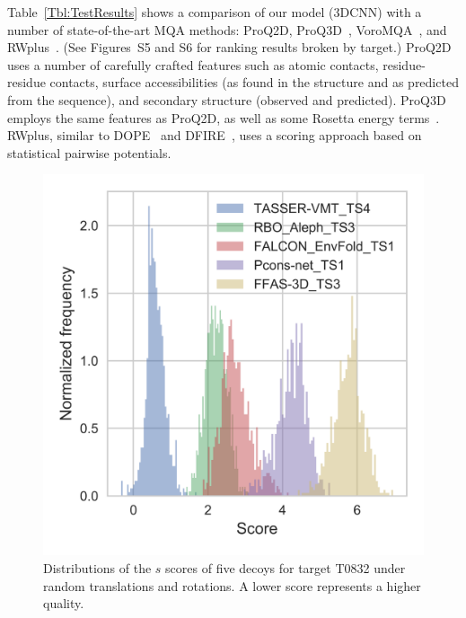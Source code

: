 \documentclass{bioinfo}
\begin{document}
Table~\ref{Tbl:TestResults} shows a comparison of our model (3DCNN)
with a number of state-of-the-art MQA methods: ProQ2D,
ProQ3D~\citep{uziela2017proq3d},
VoroMQA~\citep{olechnovivc2017voromqa}, and
RWplus~\citep{zhang2010novel}.
%
(See Figures~S5 and S6 for ranking results broken by target.)
%
ProQ2D uses a number of carefully crafted features such as atomic
contacts, residue-residue contacts, surface accessibilities (as found
in the structure and as predicted from the sequence), and secondary
structure (observed and predicted). ProQ3D employs the same features
as ProQ2D, as well as some Rosetta energy
terms~\citep{leaverfay2011rosetta}.
%
RWplus, similar to DOPE~\citep{shen2006statistical} and
DFIRE~\citep{zhou2002distance}, uses a scoring approach based on
statistical pairwise potentials.
%
\begin{figure}[t]
    \centerline{\includegraphics[width=0.7\linewidth]{image5.png}}
    \vspace{-15pt}
    \caption{Distributions of the $s$ scores of five decoys for target
    T0832 under random translations and rotations. A lower score
    represents a higher quality.}
    \label{Fig:DecoysScoreDistribution}
\end{figure}
%
\end{document}

